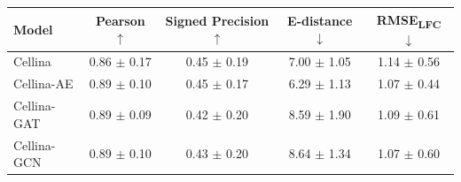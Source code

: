 \begin{tabular}{lcccc}
\toprule
Model & Pearson $\uparrow$ & Signed Precision $\uparrow$ & E-distance $\downarrow$ & RMSE\textsubscript{LFC} $\downarrow$ \\
\midrule
Cellina & 0.86 $\pm$ 0.17 & 0.45 $\pm$ 0.19 & 7.00 $\pm$ 1.05 & 1.14 $\pm$ 0.56 \\
Cellina-AE & 0.89 $\pm$ 0.10 & 0.45 $\pm$ 0.17 & 6.29 $\pm$ 1.13 & 1.07 $\pm$ 0.44 \\
\midrule
Cellina-GAT & 0.89 $\pm$ 0.09 & 0.42 $\pm$ 0.20 & 8.59 $\pm$ 1.90 & 1.09 $\pm$ 0.61 \\
Cellina-GCN & 0.89 $\pm$ 0.10 & 0.43 $\pm$ 0.20 & 8.64 $\pm$ 1.34 & 1.07 $\pm$ 0.60 \\
\bottomrule
\end{tabular}
